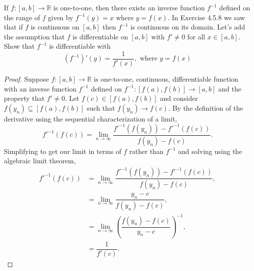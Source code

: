 \documentclass[12pt]{article}
\makeatletter
\theoremstyle{homework}
\newenvironment{exercise}[1]
{\def\@currentlabel{#1}\exercisecore}
{\endexercisecore}
\newcommand{\Reals}{\ensuremath{\mathbb R}}
\makeatother
\begin{document}
\begin{exercise}{8} If $f: [a,b] \to \Reals$ is one-to-one, then there exists an inverse function $f^{-1}$ defined on the range of $f$ given by $f^{-1}(y) = x$
  where $y = f(x)$. In Exercise 4.5.8 we saw that if $f$ is continuous on $[a,b]$ then $f^{-1}$ is continuous on its domain. Let's add the assumption that $f$ is differentiable 
  on $[a,b]$ with $f'\neq 0$ for all $x \in [a,b]$. Show that $f^{-1}$ is differentiable with
  \begin{equation*}
    (f^{-1})'(y) = \dfrac{1}{f'(x)}, \text{ where $y = f(x)$}
  \end{equation*}


  \begin{proof} Suppose  $f: [a,b] \to \Reals$ is one-to-one, continuous, differentiable function with an inverse function $f^{-1}$ defined on $f^{-1}: [f(a),f(b)] \to [a,b]$ and the property that $f'\neq 0$.    
    Let $f(c) \in [f(a),f(b)]$ and consider $f(y_n) \subseteq [f(a),f(b)]$ such that $f(y_n) \to f(c)$. By the definition of the derivative using the sequential characterization of a limit,
    \begin{equation*}
      f'^{-1}(f(c)) = \lim_{n \to \infty} \dfrac{f'^{-1}(f(y_n)) - f'^{-1}(f(c))}{f(y_n) - f(c)}.
    \end{equation*}
    Simplifying to get our limit in terms of $f$ rather than $f^{-1}$ and solving using the algebraic limit theorem,
    \begin{align*}
      f'^{-1}(f(c)) &= \lim_{n \to \infty} \dfrac{f'^{-1}(f(y_n)) - f'^{-1}(f(c))}{f(y_n) - f(c)},\\
       &= \lim_{n \to \infty} \dfrac{y_n - c}{f(y_n) - f(c)},\\
       &= \lim_{n \to \infty} \left(\dfrac{f(y_n) - f(c)}{y_n - c}\right)^{-1},\\
       &= \dfrac{1}{f'(c)}.
    \end{align*}



  \end{proof}



\end{exercise}
\end{document}
